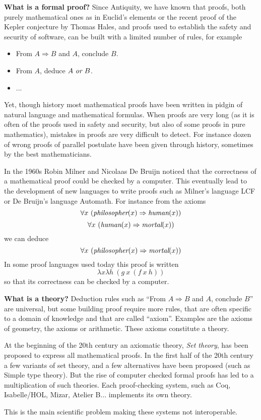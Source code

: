 {\bf What is a formal proof?}  Since Antiquity, we have known that
proofs, both purely mathematical ones as in Euclid's elements or the
recent proof of the Kepler conjecture by Thomas Hales, and proofs used
to establish the safety and security of software, can be built with a
limited number of rules, for example
\begin{itemize}
\item From $A \Rightarrow B$ and $A$, conclude $B$.
\item From $A$, deduce $A~\mbox{\it or}~B$.
\item ...
\end{itemize}
Yet, though history most mathematical proofs have been written in
pidgin of natural language and mathematical formulas. When proofs are
very long (as it is often of the proofs used in safety and security, but
also of some proofs in pure mathematics), mistakes in proofs are very
difficult to detect. For instance dozen of wrong proofs of parallel postulate
have been given through history, sometimes by the best mathematicians.

In the 1960s Robin Milner and Nicolaas De Bruijn noticed that the
correctness of a mathematical proof could be checked by a
computer. This eventually lead to the development of new languages to
write proofs such as Milner's language {\sc LCF} or De Bruijn's
language {\sc Automath}.
For instance from the axioms
$$\forall x~(\mbox{\em philosopher}(x) \Rightarrow \mbox{\em human}(x))$$
$$\forall x~(\mbox{\em human}(x) \Rightarrow \mbox{\em mortal}(x))$$
we can deduce
$$\forall x~(\mbox{\em philosopher}(x) \Rightarrow \mbox{\em mortal}(x))$$
In some proof languages used today this proof is written
$$\lambda x \lambda h~(g~x~(f~x~h))$$
so that its correctness can be checked by a computer.

{\bf What is a theory?} Deduction rules such as ``From $A \Rightarrow
B$ and $A$, conclude $B$'' are universal, but some building proof
require more rules, that are often specific to a domain of knowledge
and that are called ``axiom''. Examples are the axioms of geometry,
the axioms or arithmetic. These axioms constitute a theory.

At the beginning of the 20th century an axiomatic theory, {\em Set
  theory}, has been proposed to express all mathematical proofs. In
the first half of the 20th century a few variants of set theory, and a
few alternatives have been proposed (such as Simple type theory).  But
the rise of computer checked formal proofs has led to a multiplication
of such theories. Each proof-checking system, such as {\sc Coq}, {\sc
  Isabelle/HOL}, {\sc Mizar}, {\sc Atelier B}... implements its own
theory.

This is the main scientific problem making these systems not
interoperable.








